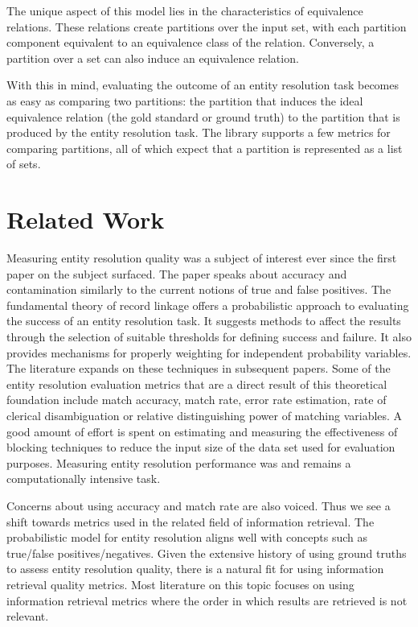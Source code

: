 \documentclass[a4paper,twoside]{article}
\begin{document}
    The unique aspect of this model lies in the characteristics of equivalence
    relations\cite{halmos1960naive}.
    These relations create partitions over the input set, with each partition
    component equivalent to an equivalence class of the relation\cite{Tal11}.
    Conversely, a partition over a set can also induce an equivalence relation.

    With this in mind, evaluating the outcome of an entity resolution task
    becomes as easy as comparing two partitions: the partition that induces the
    ideal equivalence relation (the gold standard or ground truth) to the
    partition that is produced by the entity resolution task.
    The library supports a few metrics for comparing partitions, all of which
    expect that a partition is represented as a list of sets.

    \section{Related Work}\label{sec:related}

    Measuring entity resolution quality was a subject of interest ever since the
    first paper on the subject surfaced\cite{newcombe1959}.
    The paper speaks about accuracy and contamination similarly to the current
    notions of true and false positives.
    The fundamental theory of record linkage\cite{fs1969} offers a probabilistic
    approach to evaluating the success of an entity resolution task.
    It suggests methods to affect the results through the selection of suitable
    thresholds for defining success and failure.
    It also provides mechanisms for properly weighting for independent
    probability variables.
    The literature expands on these techniques in subsequent
    papers\cite{winkler1990}.
    Some of the entity resolution evaluation metrics that are a direct result of
    this theoretical foundation include match accuracy, match
    rate\cite{jaro1989advances}, error rate estimation, rate of clerical
    disambiguation\cite{winkler1990} or relative distinguishing
    power of matching variables\cite{winkler2014}.
    A good amount of effort is spent on estimating and measuring the
    effectiveness of blocking techniques to reduce the input size of the data
    set used for evaluation purposes\cite{winkler1990,jaro1989advances}.
    Measuring entity resolution performance was and remains a computationally
    intensive task.
    
    Concerns about using accuracy and match rate are also voiced\cite{Goga2015}.
    Thus we see a shift towards metrics used in the related field of information
    retrieval.
    The probabilistic model for entity resolution aligns well with concepts such
    as true/false positives/negatives.
    Given the extensive history of using ground truths to assess entity
    resolution quality, there is a natural fit for using information retrieval
    quality metrics.
    Most literature on this topic focuses on using information retrieval metrics
    where the order in which results are retrieved is not
    relevant\cite{manning2008}.
\end{document}
